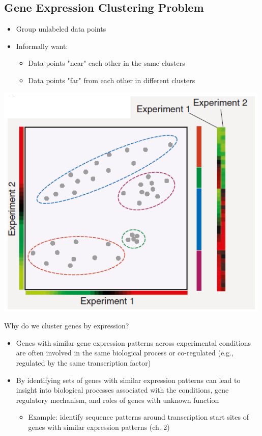 \documentclass[10pt]{article}
\begin{document}
\subsection*{Gene Expression Clustering Problem}
\begin{itemize}
    \item Group unlabeled data points
    \item Informally want:
    \begin{itemize}
        \item Data points "near" each other in the same clusters
        \item Data points "far" from each other in different clusters
    \end{itemize}
\end{itemize}
\begin{center}
    \includegraphics[scale=0.6]{W6_5.png}
\end{center}
Why do we cluster genes by expression?
\begin{itemize}
    \item Genes with similar gene expression patterns across experimental conditions are often involved in the same biological process or co-regulated (e.g., regulated by the same transcription factor)
    \item By identifying sets of genes with similar expression patterns can lead to insight into biological processes associated with the conditions, gene regulatory mechanism, and roles of genes with unknown function
    \begin{itemize}
        \item Example: identify sequence patterns around transcription start sites of genes with similar expression patterns (ch. 2)
    \end{itemize}
\end{itemize}
\end{document}
